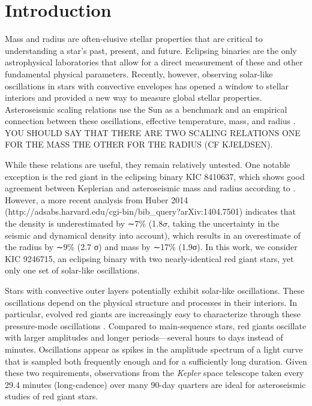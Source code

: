 
\section{Introduction}\label{intro}

Mass and radius are often-elusive stellar properties that are critical to understanding a star's past, present, and future. Eclipsing binaries are the only astrophysical laboratories that allow for a direct measurement of these and other fundamental physical parameters. Recently, however, observing solar-like oscillations in stars with convective envelopes has opened a window to stellar interiors and provided a new way to measure global stellar properties. Asteroseismic scaling relations use the Sun as a benchmark and an empirical connection between these oscillations, effective temperature, mass, and radius \citep{kje95,hub10,mos13}. YOU SHOULD SAY THAT THERE ARE TWO SCALING RELATIONS ONE FOR THE MASS THE OTHER FOR THE RADIUS (CF KJELDSEN). 

While these relations are useful, they remain relatively untested. One notable exception is the red giant in the eclipsing binary KIC 8410637, which shows good agreement between Keplerian and asteroseismic mass and radius according to \citet{fra13}. However, a more recent analysis from Huber 2014 (http://adsabs.harvard.edu/cgi-bin/bib_query?arXiv:1404.7501) indicates that the density is underestimated by ∼7\% (1.8$\sigma$, taking
the uncertainty in the seismic and dynamical density into account), which results
in an overestimate of the radius by ∼9\% (2.7 σ) and mass by ∼17\% (1.9σ). In this work, we consider KIC 9246715, an eclipsing binary with two nearly-identical red giant stars, yet only one set of solar-like oscillations.

Stars with convective outer layers potentially exhibit solar-like oscillations. These oscillations depend on the physical structure and processes in their interiors. In particular, evolved red giants are increasingly easy to characterize through these pressure-mode oscillations \citep[for a review of this topic, see][]{cha13}. Compared to main-sequence stars, red giants oscillate with larger amplitudes and longer periods---several hours to days instead of minutes. Oscillations appear as spikes in the amplitude spectrum of a light curve that is sampled both frequently enough and for a sufficiently long duration. Given these two requirements, observations from the \emph{Kepler} space telescope taken every 29.4 minutes (long-cadence) over many 90-day quarters are ideal for asteroseismic studies of red giant stars.

